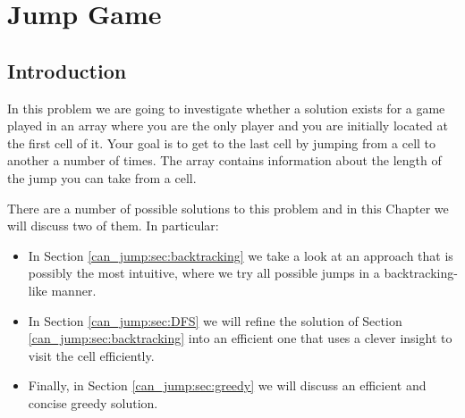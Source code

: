 %

\chapter{Jump Game}
\label{ch:can_jump}
\section*{Introduction}
In this problem we are going to investigate whether a solution exists for a game played in an array
where you are the only player and you are initially located at the first cell of it. Your goal is to
get to the last cell by jumping from a cell to another a number of times. The array contains
information about the length of the jump you can take from a cell. 

There are a number of possible solutions to this problem and in this Chapter we will discuss two of
them. In particular:
\begin{itemize}
	\item In Section \ref{can_jump:sec:backtracking} we take a look at an approach that is possibly
	 the most intuitive, where we try all possible jumps in a backtracking-like manner.
	\item In Section \ref{can_jump:sec:DFS} we will refine the solution of Section
	\ref{can_jump:sec:backtracking} into an efficient one that uses a clever insight to visit the
	cell efficiently. 
	\item Finally, in Section \ref{can_jump:sec:greedy} we will discuss an efficient and concise
	greedy solution.
\end{itemize}


